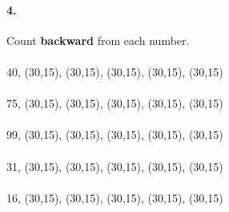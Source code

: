 \documentclass[12pt]{article}
\begin{document}
\bigskip

\paragraph{4.}
Count \textbf{backward} from each number. \\
\\
40, \framebox(30,15){}, \framebox(30,15){}, \framebox(30,15){}, \framebox(30,15){}, \framebox(30,15){}
\\
\\
75, \framebox(30,15){}, \framebox(30,15){}, \framebox(30,15){}, \framebox(30,15){}, \framebox(30,15){}
\\
\\
99, \framebox(30,15){}, \framebox(30,15){}, \framebox(30,15){}, \framebox(30,15){}, \framebox(30,15){}
\\
\\
31, \framebox(30,15){}, \framebox(30,15){}, \framebox(30,15){}, \framebox(30,15){}, \framebox(30,15){}
\\
\\
16, \framebox(30,15){}, \framebox(30,15){}, \framebox(30,15){}, \framebox(30,15){}, \framebox(30,15){}

\newpage
\end{document}
